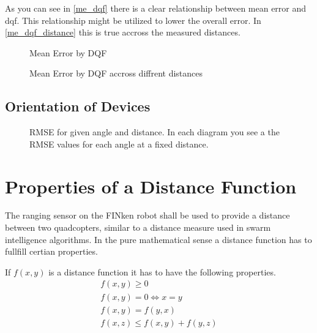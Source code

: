 As you can see in \autoref{me_dqf} there is a clear relationship between mean error and dqf.
This relationship might be utilized to lower the overall error.
In \autoref{me_dqf_distance} this is true accross the measured distances.
%	
%
%	
\begin{figure}[h]
	\centering
	
	\caption{Mean Error by DQF}
	\label{me_dqf}
\end{figure}

\begin{figure}[h]
	\centering
	
	\caption{Mean Error by DQF accross diffrent distances}
	\label{me_dqf_distance}
\end{figure}

\subsection{Orientation of Devices}
\begin{figure}[h]
	\centering
	
	\caption[RMSE for given angle and distance]{RMSE for given angle and distance. In each diagram you see a the RMSE values for each angle at a fixed distance.}
	\label{2m}
\end{figure}

\section{Properties of a Distance Function}
The ranging sensor on the FINken robot shall be used to provide a distance between two quadcopters, similar to a distance measure used in swarm intelligence algorithms.
In the pure mathematical sense a distance function has to fullfill certian properties.

If $f(x, y)$ is a distance function it has to have the following properties.
\begin{eqnarray}
f(x, y) \ge 0 \\
f(x, y) = 0 \iff x = y \\ 
f(x, y) = f(y, x) \\ 
f(x, z) \le f(x, y) + f(y, z)
\end{eqnarray}

